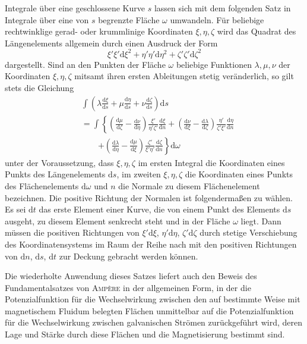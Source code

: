 Integrale über eine geschlossene Kurve $s$ lassen sich mit dem folgenden Satz in Integrale über eine von $s$ begrenzte Fläche $\omega$ umwandeln. Für beliebige rechtwinklige gerad- oder krummlinige Koordinaten $\xi,\eta,\zeta$ wird das Quadrat des Längenelements allgemein durch einen Ausdruck der Form
\[
\xi'\xi'\mathrm d\xi^2+\eta'\eta'\mathrm d\eta^2+\zeta'\zeta'\mathrm d\zeta^2
\]
dargestellt. Sind an den Punkten der Fläche $\omega$ beliebige Funktionen $\lambda,\mu,\nu$ der Koordinaten $\xi,\eta,\zeta$ mitsamt ihren ersten Ableitungen stetig veränderlich, so gilt stets die Gleichung
\[
\begin{aligned}
&\int\left(\lambda\frac{\mathrm d\xi}{\mathrm ds}+\mu\frac{\mathrm d\eta}{\mathrm ds}+\nu\frac{\mathrm d\zeta}{\mathrm ds}\right)\mathrm ds\\
&=\int\left\{\left(\frac{\mathrm d\mu}{\mathrm d\zeta}-\frac{\mathrm d\nu}{\mathrm d\eta}\right)\frac{\xi'}{\eta'\zeta'}\frac{\mathrm d\xi}{\mathrm dn}+\left(\frac{\mathrm d\nu}{\mathrm d\xi}-\frac{\mathrm d\lambda}{\mathrm d\zeta}\right)\frac{\eta'}{\zeta'\xi'}\frac{\mathrm d\eta}{\mathrm dn}\right.\\
&\qquad\left.+\left(\frac{\mathrm d\lambda}{\mathrm d\eta}-\frac{\mathrm d\mu}{\mathrm d\xi}\right)\frac{\zeta'}{\xi'\eta'}\frac{\mathrm d\zeta}{\mathrm dn}\right\}\mathrm d\omega
\end{aligned}
\]
unter der Voraussetzung, dass $\xi,\eta,\zeta$ im ersten Integral die Koordinaten eines Punkts des Längenelements $\mathrm ds$, im zweiten $\xi,\eta,\zeta$ die Koordinaten eines Punkts des Flächenelements $\mathrm d\omega$ und $n$ die Normale zu diesem Flächenelement bezeichnen. Die positive Richtung der Normalen ist folgendermaßen zu wählen. Es sei $\mathrm dt$ das erste Element einer Kurve, die von einem Punkt des Elements $\mathrm ds$ ausgeht, zu diesem Element senkrecht steht und in der Fläche $\omega$ liegt. Dann müssen die positiven Richtungen von $\xi'\mathrm d\xi$, $\eta'\mathrm d\eta$, $\zeta'\mathrm d\zeta$ durch stetige Verschiebung des Koordinatensystems im Raum der Reihe nach mit den positiven Richtungen von $\mathrm dn$, $\mathrm ds$, $\mathrm dt$ zur Deckung gebracht werden können.


Die wiederholte Anwendung dieses Satzes liefert auch den Beweis des Fundamentalsatzes von \textsc{Ampère} in der allgemeinen Form, in der die Potenzialfunktion für die Wechselwirkung zwischen den auf bestimmte Weise mit magnetischem Fluidum belegten Flächen unmittelbar auf die Potenzialfunktion für die Wechselwirkung zwischen galvanischen Strömen zurückgeführt wird, deren Lage und Stärke durch diese Flächen und die Magnetisierung bestimmt sind.

